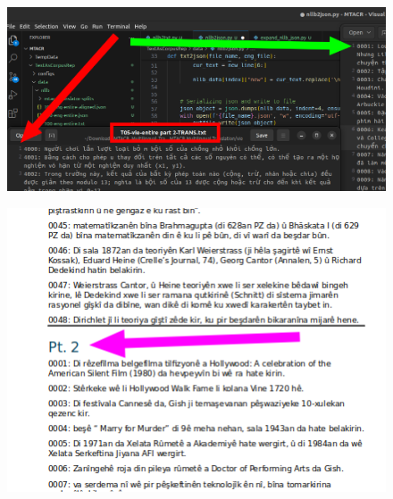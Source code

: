 \documentclass[aspectratio=169]{beamer}
\begin{document}
\begin{frame}[fragile]
\begin{minipage}{.40\textwidth}
        \centering
        \begin{figure}
            \includegraphics[width=1.0\textwidth]{images/MTACR_fun_with_experts_003.png} 
        \end{figure}
    \end{minipage}%
    \begin{minipage}{.40\textwidth}
        \centering
        \begin{figure}
            \includegraphics[width=1.0\textwidth]{images/MTACR_fun_with_experts_005.png} 
        \end{figure}
    \end{minipage}
\end{frame}
\end{document}
